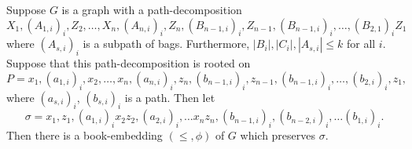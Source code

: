 
Suppose $G$ is a graph with a path-decomposition \[X_1,(A_{1,i})_i, Z_2,\ldots, X_n, (A_{n,i})_i,Z_n,(B_{n-1, i})_i, Z_{n-1}, (B_{n-1, i})_i, \ldots,(B_{2,1})_i Z_1\] where $(A_{s,i})_i$ is a subpath of bags. Furthermore, $|B_i|, |C_i|, |A_{s,i}| \leq k$ for all $i$. Suppose that this path-decomposition is rooted on \[P = x_1,(a_{1,i})_i, x_2,\ldots, x_n, (a_{n,i})_i,z_n,(b_{n-1, i})_i, z_{n-1}, (b_{n-1, i})_i, \ldots, (b_{2,i})_i, z_1,\] 
where $(a_{s,i})_i$, $(b_{s,i})_i$ is a path.
Then let \[\sigma = x_1, z_1, (a_{1,i})_i x_2 z_2, (a_{2,i})_i, \ldots x_n z_n, (b_{n-1, i})_i, (b_{n-2, i})_i, \ldots (b_{1, i})_i.\] Then there is a book-embedding $(\leq, \phi)$ of $G$ which preserves $\sigma$. 